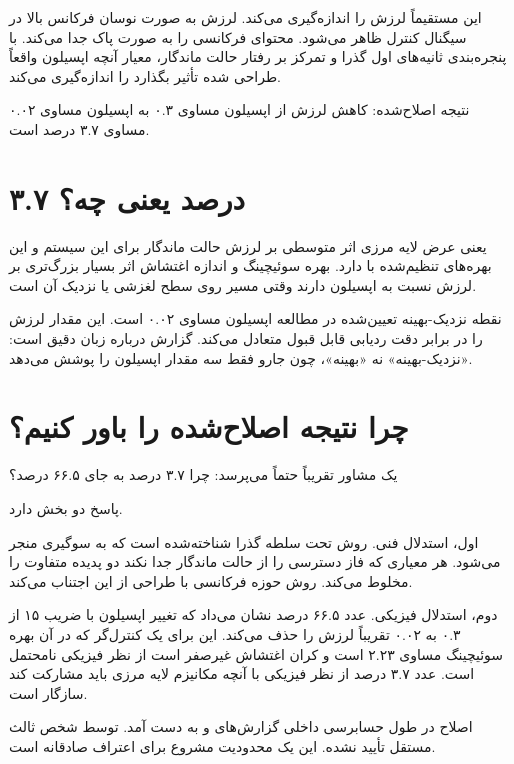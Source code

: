 \documentclass[12pt, a4paper]{article}
\newcommand{\dash}{\lr{---}}
\begin{document}
اين مستقيماً لرزش را اندازه‌گيری می‌کند. لرزش به صورت نوسان فرکانس بالا در سيگنال کنترل ظاهر می‌شود.  محتوای فرکانسی را به صورت پاک جدا می‌کند. با پنجره‌بندی ثانيه‌های اول گذرا و تمرکز بر رفتار حالت ماندگار، معيار آنچه اپسيلون واقعاً طراحی شده تأثير بگذارد را اندازه‌گيری می‌کند.

نتيجه اصلاح‌شده: کاهش لرزش از اپسيلون مساوی ۰.۳ به اپسيلون مساوی ۰.۰۲ مساوی ۳.۷ درصد است.

\section{۳.۷ درصد يعنی چه؟}

يعنی عرض لايه مرزی اثر متوسطی بر لرزش حالت ماندگار برای اين سيستم و اين بهره‌های تنظيم‌شده با  دارد. بهره سوئيچينگ  و اندازه اغتشاش اثر بسيار بزرگ‌تری بر لرزش نسبت به اپسيلون دارند وقتی مسير روی سطح لغزشی يا نزديک آن است.

نقطه نزديک-بهينه تعيين‌شده در مطالعه اپسيلون مساوی ۰.۰۲ است. اين مقدار لرزش را در برابر دقت رديابی قابل قبول متعادل می‌کند. گزارش درباره زبان دقيق است: «نزديک-بهينه» نه «بهينه»، چون جارو فقط سه مقدار اپسيلون را پوشش می‌دهد.

\section{چرا نتيجه اصلاح‌شده را باور کنيم؟}

يک مشاور تقريباً حتماً می‌پرسد: چرا ۳.۷ درصد به جای ۶۶.۵ درصد؟

پاسخ دو بخش دارد.

اول، استدلال فنی. روش  تحت سلطه گذرا شناخته‌شده است که به سوگيری منجر می‌شود. هر معياری که فاز دسترسی را از حالت ماندگار جدا نکند دو پديده متفاوت را مخلوط می‌کند. روش حوزه فرکانسی با طراحی از اين اجتناب می‌کند.

دوم، استدلال فيزيکی. عدد ۶۶.۵ درصد نشان می‌داد که تغيير اپسيلون با ضريب ۱۵ \dash{} از ۰.۳ به ۰.۰۲ \dash{} تقريباً لرزش را حذف می‌کند. اين برای يک کنترل‌گر که در آن بهره سوئيچينگ  مساوی ۲.۲۳ است و کران اغتشاش غيرصفر است از نظر فيزيکی نامحتمل است. عدد ۳.۷ درصد از نظر فيزيکی با آنچه مکانيزم لايه مرزی بايد مشارکت کند سازگار است.

اصلاح در طول حسابرسی داخلی گزارش‌های  و  به دست آمد. توسط شخص ثالث مستقل تأييد نشده. اين يک محدوديت مشروع برای اعتراف صادقانه است.

\end{document}
